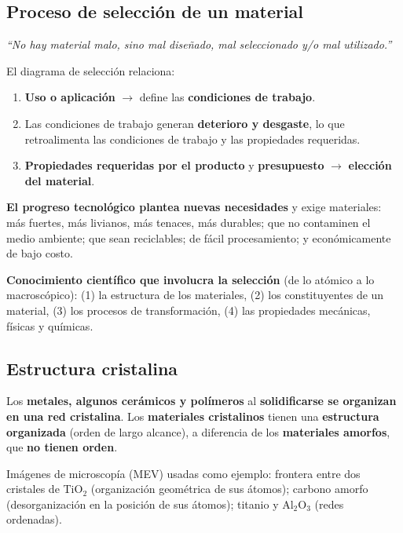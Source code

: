 \documentclass[12pt,a4paper]{article}
\begin{document}
\subsection{Proceso de selección de un material}

\begin{defi}
	\emph{``No hay material malo, sino mal diseñado, mal seleccionado y/o mal
		utilizado.''}
\end{defi}

El diagrama de selección relaciona:
\begin{enumerate}
	\item \textbf{Uso o aplicación} $\rightarrow$ define las \textbf{condiciones
		      de trabajo}.
	\item Las condiciones de trabajo generan \textbf{deterioro y desgaste}, lo que
	      retroalimenta las condiciones de trabajo y las propiedades requeridas.
	\item \textbf{Propiedades requeridas por el producto} y \textbf{presupuesto}
	      $\rightarrow$ \textbf{elección del material}.
\end{enumerate}

\textbf{El progreso tecnológico plantea nuevas necesidades} y exige materiales:
más fuertes, más livianos, más tenaces, más durables; que no contaminen el medio
ambiente; que sean reciclables; de fácil procesamiento; y económicamente de bajo
costo.

\textbf{Conocimiento científico que involucra la selección} (de lo atómico a lo
macroscópico): (1) la estructura de los materiales, (2) los constituyentes de un
material, (3) los procesos de transformación, (4) las propiedades mecánicas,
físicas y químicas.

\subsection{Estructura cristalina}

\begin{defi}
	Los \textbf{metales, algunos cerámicos y polímeros} al \textbf{solidificarse
		se
		organizan en una red cristalina}. Los \textbf{materiales cristalinos} tienen
	una
	\textbf{estructura organizada} (orden de largo alcance), a diferencia de los
	\textbf{materiales amorfos}, que \textbf{no tienen orden}.
\end{defi}

Imágenes de microscopía (MEV) usadas como ejemplo: frontera entre dos cristales
de TiO$_2$ (organización geométrica de sus átomos); carbono amorfo
(desorganización en la posición de sus átomos); titanio y Al$_2$O$_3$ (redes
ordenadas).
\end{document}
